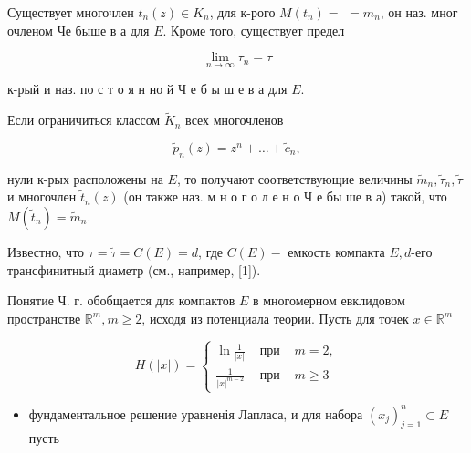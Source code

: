 \documentclass[10pt]{article}
\begin{document}
Существует многочлен $t_{n}(z) \in K_{n}$, для к-рого $M\left(t_{n}\right)=$ $=m_{n}$, он наз. мног очленом Че быше в а для $E$. Кроме того, существует предел



\[

\lim _{n \rightarrow \infty} \tau_{n}=\tau

\]



к-рый и наз. по с т о я н но й Ч е б ы ш е в а для $E$.



Если ограничиться классом $\tilde{K}_{n}$ всех многочленов



\[

\tilde{p}_{n}(z)=z^{n}+\ldots+\tilde{c}_{n},

\]



нули к-рых расположены на $E$, то получают соответствующие величины $\tilde{m}_{n}, \tilde{\tau}_{n}, \tilde{\tau}$ и многочлен $\tilde{t}_{n}(z)$ (он также наз. м н о г о л е н о Ч е бы ше в а) такой, что $M\left(\tilde{t}_{n}\right)=\tilde{m}_{n}$.



Известно, что $\tau=\tilde{\tau}=C(E)=d$, где $C(E)-$ емкость компакта $E, d$-его трансфинитный диаметр (см., например, [1]).



Понятие Ч. г. обобщается для компактов $E$ в многомерном евклидовом пространстве $\mathbb{R}^{m}, m \geqslant 2$, исходя из потенциала теории. Пусть для точек $x \in \mathbb{R}^{m}$



\[

H(|x|)=\left\{\begin{array}{lll}

\ln \frac{1}{|x|} & \text { при } & m=2, \\

\frac{1}{|x|^{m-2}} & \text { при } & m \geqslant 3

\end{array}\right.

\]



\begin{itemize}

  \item фундаментальное решение уравненія Лапласа, и для набора $\left(x_{j}\right)_{j=1}^{n} \subset E$ пусть

\end{itemize}
\end{document}
